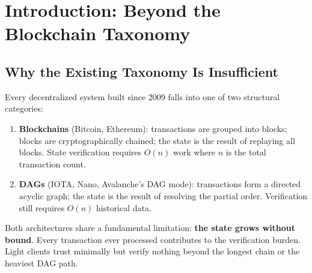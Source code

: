\documentclass[11pt, a4paper]{article}
\newcommand{\GATE}{\textsc{Gate Green}}
\begin{document}
\begin{abstract}
All four pillars are connected: encrypted envelopes enter the mempool, the ordering ceremony commits the sequence, the threshold decrypt unlocks the payloads, the fold pipeline compresses them into $\pi_E$, and the PoUW derives consensus weight from the verified computation. The system is implemented in C++20 (41 headers, zero external cryptographic libraries) and verified by a bilingual Python$\leftrightarrow$C++ golden-oracle methodology that caught 223 defects across the development lifecycle, each owned in an append-only decision ledger (281 decisions, 203 laws). The reference implementation passes 34/34 conformance tests (\GATE{}), is reproducible from a public GitHub repository, and the complete testnet demonstrably processes encrypted transactions end to end.
\end{abstract}

\tableofcontents
\newpage

\section{Introduction: Beyond the Blockchain Taxonomy}

\subsection{Why the Existing Taxonomy Is Insufficient}

Every decentralized system built since 2009 falls into one of two structural categories:

\begin{enumerate}
\item \textbf{Blockchains} (Bitcoin, Ethereum): transactions are grouped into blocks; blocks are cryptographically chained; the state is the result of replaying all blocks. State verification requires $O(n)$ work where $n$ is the total transaction count.
\item \textbf{DAGs} (IOTA, Nano, Avalanche's DAG mode): transactions form a directed acyclic graph; the state is the result of resolving the partial order. Verification still requires $O(n)$ historical data.
\end{enumerate}

Both architectures share a fundamental limitation: \textbf{the state grows without bound}. Every transaction ever processed contributes to the verification burden. Light clients trust minimally but verify nothing beyond the longest chain or the heaviest DAG path.
\end{document}
